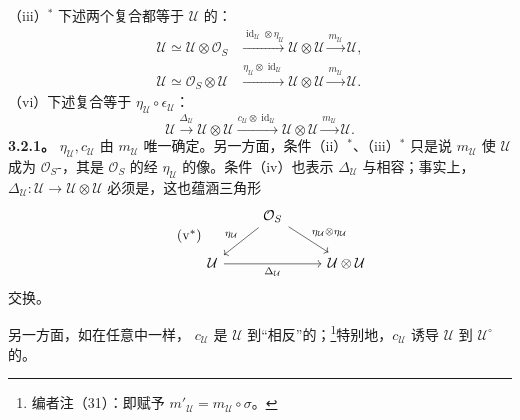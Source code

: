 （iii）$^*$ 下述两个复合都等于 $\mathcal U$ 的：
\[
\begin{aligned}
\mathcal U\simeq\mathcal U\otimes\mathcal O_S&\xrightarrow{\operatorname{id}_{\mathcal U}\otimes\eta_{\mathcal U}}\mathcal U\otimes\mathcal U\xrightarrow{m_{\mathcal U}}\mathcal U,\\
\mathcal U\simeq\mathcal O_S\otimes\mathcal U&\xrightarrow{\eta_{\mathcal U}\otimes\operatorname{id}_{\mathcal U}}\mathcal U\otimes\mathcal U\xrightarrow{m_{\mathcal U}}\mathcal U.
\end{aligned}
\]
（vi）下述复合等于 $\eta_{\mathcal U}\circ\epsilon_{\mathcal U}$：
\[
\mathcal U\xrightarrow{\Delta_{\mathcal U}}\mathcal U\otimes\mathcal U\xrightarrow{c_{\mathcal U}\otimes\operatorname{id}_{\mathcal U}}\mathcal U\otimes\mathcal U\xrightarrow{m_{\mathcal U}}\mathcal U.
\]
\textbf{3.2.1。} $\eta_{\mathcal U},c_{\mathcal U}$ 由 $m_{\mathcal U}$ 唯一确定。另一方面，条件（ii）$^*$、（iii）$^*$ 只是说 $m_{\mathcal U}$ 使 $\mathcal U$ 成为 $\mathcal O_S$-，其是 $\mathcal O_S$ 的经 $\eta_{\mathcal U}$ 的像。条件（iv）也表示 $\Delta_{\mathcal U}$ 与相容；事实上，$\Delta_{\mathcal U}:\mathcal U\to\mathcal U\otimes\mathcal U$ 必须是，这也蕴涵三角形
\[
\tag{$\mathrm v^*$}
\begin{tikzcd}
&\mathcal O_S\arrow[dl,"\eta_{\mathcal U}"']\arrow[dr,"\eta_{\mathcal U}\otimes\eta_{\mathcal U}"]&\\
\mathcal U\arrow[rr,"\Delta_{\mathcal U}"']&&\mathcal U\otimes\mathcal U
\end{tikzcd}
\]
交换。

另一方面，如在任意中一样， $c_{\mathcal U}$ 是 $\mathcal U$ 到“相反”的；\footnote{编者注（31）：即赋予 $m'_{\mathcal U}=m_{\mathcal U}\circ\sigma$。}特别地，$c_{\mathcal U}$ 诱导 $\mathcal U$ 到 $\mathcal U^\circ$ 的。

